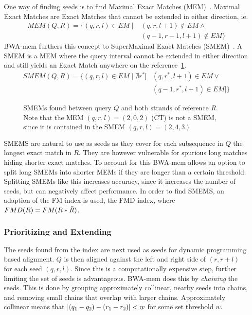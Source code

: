 One way of finding seeds is to find Maximal Exact Matches (MEM)~\cite{longmem}.
Maximal Exact Matches are Exact Matches that cannot be extended in either direction, ie. 
\begin{align*}
  MEM(Q, R) = \{(q, r, l) \in EM \mid &(q, r, l+1) \notin EM \wedge \\
  & (q-1, r-1, l+1) \notin EM \}
\end{align*}
BWA-mem furthers this concept to SuperMaximal Exact Matches (SMEM)~\cite{origsmem}.
A SMEM is a MEM where the query interval cannot be extended in either direction and still yields an Exact Match anywhere on the reference~\ref{fig:smem}.
\begin{align*}
  SMEM(Q, R) = \{(q, r, l) \in EM \mid \nexists r^*[&(q, r^*, l+1) \in EM \vee\\
    &(q-1, r^*, l+1) \in EM] \}
\end{align*}
\begin{figure}
  \tikzpicture
  
  \endtikzpicture
  \caption{SMEMs found between query $Q$ and both strands of reference $R$. Note that the MEM $(q, r, l)=(2, 0, 2)$ (CT) is not a SMEM, since it is contained in the SMEM $(q, r, l) = (2, 4, 3)$}
  \label{fig:smem}
\end{figure}

SMEMS are natural to use as seeds as they cover for each subsequence in $Q$ the longest exact match in $R$.
They are however vulnerable for spurious long matches hiding shorter exact matches.
To account for this BWA-mem allows an option to split long SMEMs into shorter MEMs if they are longer than a certain threshold.
Splitting SMEMs like this increases accuracy, since it increases the number of seeds, but can negatively affect performance. 
In order to find SMEMS, an adaption of the FM index is used, the FMD index, where $FMD(R) = FM(R * \bar{R})$.

\subsubsection{Prioritizing and Extending}
The seeds found from the index are next used as seeds for dynamic programming based alignment.
$Q$ is then aligned against the left and right side of $(r, r+l)$ for each seed $(q, r, l)$.
Since this is a computationally expensive step, further limiting the set of seeds is advantageous.
BWA-mem does this by \emph{chaining} the seeds.
This is done by grouping approximately collinear, nearby seeds into chains, and removing small chains that overlap with larger chains.
Approximately collinear means that $\left | (q_1-q_2) -(r_1-r_2) \right |<w$ for some set threshold $w$.

